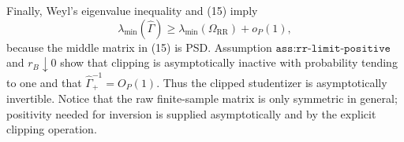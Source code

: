 Finally, Weyl's eigenvalue inequality and (15) imply
\[
 \lambda_{\min}(\widehat\Gamma)
 \geq\lambda_{\min}(\Omega_{\mathrm{RR}})+o_P(1),
\]
because the middle matrix in (15) is PSD.  Assumption \(\texttt{ass:rr-limit-positive}\) and \(r_B\downarrow0\) show that clipping is asymptotically inactive with probability tending to one and that \(\widehat\Gamma_+^{-1}=O_P(1)\).  Thus the clipped studentizer is asymptotically invertible.  Notice that the raw finite-sample matrix is only symmetric in general; positivity needed for inversion is supplied asymptotically and by the explicit clipping operation.
